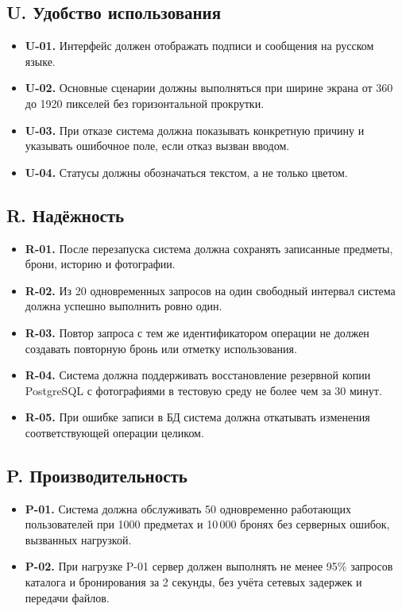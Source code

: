 \documentclass[a4paper,12pt]{article}
\begin{document}
\subsection{U. Удобство использования}
\begin{itemize}[itemsep=3pt]
\item \textbf{U-01.} Интерфейс должен отображать подписи и сообщения на русском языке.
\item \textbf{U-02.} Основные сценарии должны выполняться при ширине экрана от 360 до 1920 пикселей без горизонтальной прокрутки.
\item \textbf{U-03.} При отказе система должна показывать конкретную причину и указывать ошибочное поле, если отказ вызван вводом.
\item \textbf{U-04.} Статусы должны обозначаться текстом, а не только цветом.
\end{itemize}

\subsection{R. Надёжность}
\begin{itemize}[itemsep=3pt]
\item \textbf{R-01.} После перезапуска система должна сохранять записанные предметы, брони, историю и фотографии.
\item \textbf{R-02.} Из 20 одновременных запросов на один свободный интервал система должна успешно выполнить ровно один.
\item \textbf{R-03.} Повтор запроса с тем же идентификатором операции не должен создавать повторную бронь или отметку использования.
\item \textbf{R-04.} Система должна поддерживать восстановление резервной копии PostgreSQL с фотографиями в тестовую среду не более чем за 30 минут.
\item \textbf{R-05.} При ошибке записи в БД система должна откатывать изменения соответствующей операции целиком.
\end{itemize}

\subsection{P. Производительность}
\begin{itemize}[itemsep=3pt]
\item \textbf{P-01.} Система должна обслуживать 50 одновременно работающих пользователей при 1000 предметах и 10\,000 бронях без серверных ошибок, вызванных нагрузкой.
\item \textbf{P-02.} При нагрузке P-01 сервер должен выполнять не менее 95\% запросов каталога и бронирования за 2 секунды, без учёта сетевых задержек и передачи файлов.
\end{itemize}
\end{document}
